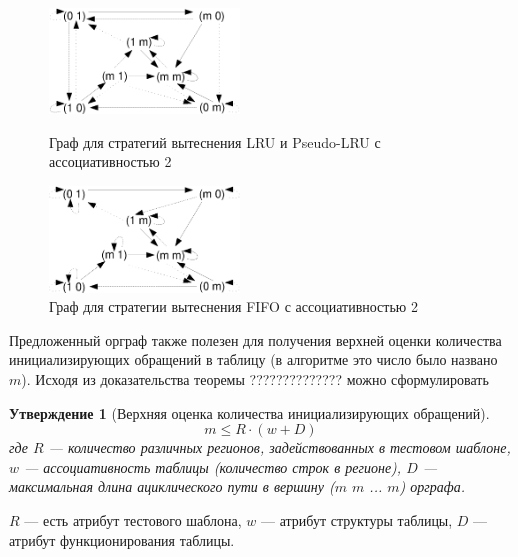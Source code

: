 \documentclass[14pt]{extreport}
\newtheorem{utv}{Утверждение}
\newcommand{\LRU}{\textsf{LRU}\xspace}
\newcommand{\FIFO}{\textsf{FIFO}\xspace}
\newcommand{\PseudoLRU}{\textsf{Pseudo-LRU}\xspace}
\begin{document}
\begin{figure}[h]
\parbox{0.5\textwidth}{ \centering
  \includegraphics[width=0.45\textwidth]{2.theor/lrupolicy}
  \caption{Граф для стратегий вытеснения \LRU и \PseudoLRU с ассоциативностью 2}
  \label{fig:lrupolicy}
} \vline
\parbox{0.5\textwidth}{ \centering
  \includegraphics[width=0.45\textwidth]{2.theor/fifopolicy}
  \caption{Граф для стратегии вытеснения \FIFO с ассоциативностью 2}
  \label{fig:fifopolicy}
}
\end{figure}


Предложенный орграф также полезен для получения верхней оценки количества инициализирующих обращений в таблицу (в алгоритме это число было названо $m$). Исходя из доказательства теоремы ?????????????? можно сформулировать

\begin{utv}[Верхняя оценка количества инициализирующих обращений]
$$m \leqslant R \cdot (w + D)$$
где $R$ --- количество различных регионов, задействованных в тестовом шаблоне, $w$ --- ассоциативность таблицы (количество строк в регионе), $D$ --- максимальная длина ациклического пути в вершину ($m$ $m$ ... $m$) орграфа.
\end{utv}

$R$ --- есть атрибут тестового шаблона, $w$ --- атрибут структуры таблицы, $D$ --- атрибут функционирования таблицы.


\end{document}
